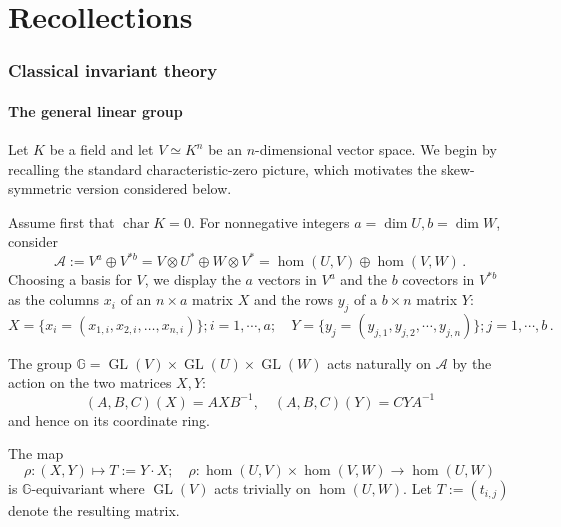 \documentclass[10pt]{amsart}
\theoremstyle{definition}
\theoremstyle{remark}
\newcommand{\GL}{\operatorname{GL}}
\begin{document}
  \medskip
\noindent
 
\part{Recollections}
\section{Classical invariant theory}



\subsection{The general linear group}

Let $K$ be a field and let $V\simeq K^n$ be an $n$-dimensional vector space.  We begin by recalling the standard characteristic-zero picture, which motivates the skew-symmetric version considered below.


Assume first that $\operatorname{char}K=0$.  For nonnegative integers $a=\dim U,b=\dim W$, 
consider \begin{equation}\label{lafond}
\mathcal A:=V^a\oplus V^{*b}=V\otimes U^*\oplus W\otimes V^*=\hom(U,V)\oplus \hom(V,W)\,.
\end{equation}   Choosing a basis for $V$, we  display the $a$ vectors in $V^a$  and the $b$   covectors in $V^{*b}$   as the columns $x_i$ of an $n\times a$ matrix $X$ and the rows  $y_j$ of a  $b\times n$ matrix $Y$:\begin{equation}\label{levar}
X=\{x_i=(x_{1,i}, x_{2,i},\dots, x_{n,i})\}; i=1,\cdots,a;\quad Y=\{y_j=(y_{j, 1},  y_{ j,2},\cdots, y_{ j,n})\};j=1,\cdots,b\,. 
\end{equation}  \medskip
 


The group $\mathbb G= \GL(V)\times \GL(U)\times \GL(W)$ acts naturally on $\mathcal A$ by the action on the two matrices $X,Y$:
\begin{equation}\label{matrix-action}
(A,B,C)(X)=A X B^{-1},\quad (A,B,C)(Y)=C Y A^{-1}
\end{equation} and hence on its coordinate ring. 

The map
\begin{equation}\label{acco}
\rho:(X,Y)\mapsto T:=Y\cdot X;\quad \rho:\hom(U,V)\times \hom(V,W)\to \hom(U,  W)
\end{equation}
is $\mathbb G$-equivariant where $ \GL(V)$ acts trivially on $\hom(U,  W)$. Let $T:=(t_{i,j})$ denote the resulting matrix.
\end{document}
